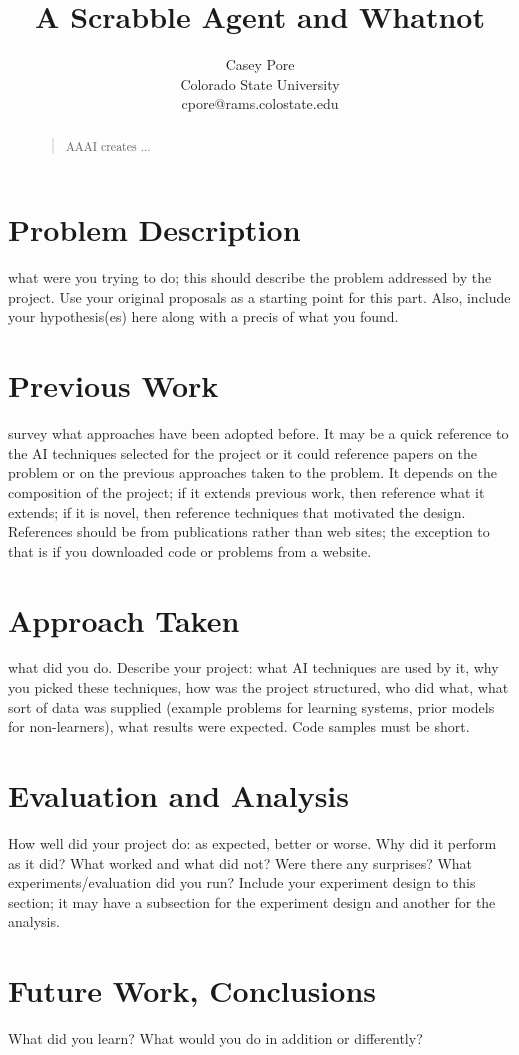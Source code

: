 \documentclass[letterpaper]{article}
\title{A Scrabble Agent and Whatnot}
\author{Casey Pore \\
Colorado State University\\
cpore@rams.colostate.edu\\
}
\begin{document}
\maketitle

\begin{abstract}
\begin{quote}
AAAI creates ...
\end{quote}
\end{abstract}

\section{Problem Description}
what were you trying to do; this should describe the problem addressed by the project. Use your original proposals as a starting point for this part. Also, include your hypothesis(es) here along with a precis of what you found.

\section{Previous Work}
survey what approaches have been adopted before. It may be a quick reference to the AI techniques selected for the project or it could reference papers on the problem or on the previous approaches taken to the problem. It depends on the composition of the project; if it extends previous work, then reference what it extends; if it is novel, then reference techniques that motivated the design. References should be from publications rather than web sites; the exception to that is if you downloaded code or problems from a website.

\section{Approach Taken}
what did you do. Describe your project: what AI techniques are used by it, why you picked these techniques, how was the project structured, who did what, what sort of data was supplied (example problems for learning systems, prior models for non-learners), what results were expected. Code samples must be short.

\section{Evaluation and Analysis}
How well did your project do: as expected, better or worse. Why did it perform as it did? What worked and what did not? Were there any surprises? What experiments/evaluation did you run? Include your experiment design to this section; it may have a subsection for the experiment design and another for the analysis.

\section{Future Work, Conclusions}
What did you learn? What would you do in addition or differently? \cite{Torre2008} \cite{Young2013} \cite{Shapiro1982}





\end{document}

